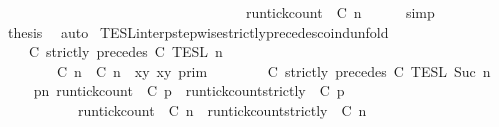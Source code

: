 \begin{isabellebody}
\ \ \ \ \ \ \ \ \ \ \ \ \ \ \ \ \ \ \ \ \ \ \ \ \ \ \ \ \ \ \ \ \ \ {\isasymle}\ {\isacharparenleft}run{\isacharunderscore}tick{\isacharunderscore}count\ {\isasymrho}\ C\ n{\isacharparenright}{\isacartoucheclose}{\isacharbrackright}\isanewline
\ \ \ \ \isamarkupfalse%
\ simp\isanewline
\ \ \isamarkupfalse%
\ {\isacharquery}thesis\ \isamarkupfalse%
\ auto\isanewline
{}\isamarkupfalse%
%
\endisatagproof
{\isafoldproof}%
%
\isadelimproof
\isanewline
%
\endisadelimproof
\isanewline
{}\isamarkupfalse%
\ TESL{\isacharunderscore}interp{\isacharunderscore}stepwise{\isacharunderscore}strictly{\isacharunderscore}precedes{\isacharunderscore}coind{\isacharunderscore}unfold{\isacharcolon}\isanewline
\ \ \ {\isacartoucheopen}{\isasymlbrakk}\ C\ strictly\ precedes\ C\ {\isasymrbrakk}\isactrlsub T\isactrlsub E\isactrlsub S\isactrlsub L\isactrlbsup {\isasymge}\ n\isactrlesup \ {\isacharequal}\ \ \ \ \ \ \ \ \ \ \ \ \ \ \ %
\isanewline
\ \ \ \ \ \ {\isasymlbrakk}\ {\isacharparenleft}{\isasymlceil}{\isacharhash}\isactrlsup {\isasymle}\ C\ n{\isacharcomma}\ {\isacharhash}\isactrlsup {\isacharless}\ C\ n{\isasymrceil}\ {\isasymin}\ {\isacharparenleft}{\isasymlambda}{\isacharparenleft}x{\isacharcomma}y{\isacharparenright}{\isachardot}\ x{\isasymle}y{\isacharparenright}{\isacharparenright}\ {\isasymrbrakk}\isactrlsub p\isactrlsub r\isactrlsub i\isactrlsub m\isanewline
\ \ \ \ \ \ {\isasyminter}\ {\isasymlbrakk}\ C\ strictly\ precedes\ C\ {\isasymrbrakk}\isactrlsub T\isactrlsub E\isactrlsub S\isactrlsub L\isactrlbsup {\isasymge}\ Suc\ n\isactrlesup {\isacartoucheclose}\isanewline
%
\isadelimproof
%
\endisadelimproof
%
\isatagproof
{}\isamarkupfalse%
\ {\isacharminus}\isanewline
\ \ \isamarkupfalse%
\ {\isacartoucheopen}{\isacharbraceleft}{\isasymrho}{\isachardot}\ {\isasymforall}p{\isasymge}n{\isachardot}\ {\isacharparenleft}run{\isacharunderscore}tick{\isacharunderscore}count\ {\isasymrho}\ C\ p{\isacharparenright}\ {\isasymle}\ {\isacharparenleft}run{\isacharunderscore}tick{\isacharunderscore}count{\isacharunderscore}strictly\ {\isasymrho}\ C\ p{\isacharparenright}{\isacharbraceright}\isanewline
\ \ \ \ \ \ \ \ \ {\isacharequal}\ {\isacharbraceleft}{\isasymrho}{\isachardot}\ {\isacharparenleft}run{\isacharunderscore}tick{\isacharunderscore}count\ {\isasymrho}\ C\ n{\isacharparenright}\ {\isasymle}\ {\isacharparenleft}run{\isacharunderscore}tick{\isacharunderscore}count{\isacharunderscore}strictly\ {\isasymrho}\ C\ n{\isacharparenright}{\isacharbraceright}\isanewline

\end{isabellebody}
